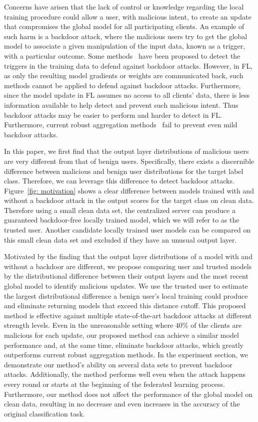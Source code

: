 \documentclass{article} %
\begin{document}
Concerns have arisen that the lack of control or knowledge regarding the local training procedure could allow a user, with malicious intent, to create an update that compromises the global model for all participating clients. An example of such harm is a backdoor attack,  where the malicious users try to get the global model to associate a given manipulation of the input data, known as a trigger, with a particular outcome. Some methods~\citep{kurita2020weight,qi2020onion,li2021backdoor} have been proposed to detect the triggers in the training data to defend against backdoor attacks. However, in FL, as only the resulting model gradients or weights are communicated back, such methods cannot be applied to defend against backdoor attacks. Furthermore, since the model update in FL assumes no access to all clients' data, there is less information available to help detect and prevent such malicious intent. Thus backdoor attacks may be easier to perform and harder to detect in FL.  Furthermore, current robust aggregation methods~\citep{trim-mean} fail to prevent even mild backdoor attacks.

In this paper, we first find that the output layer distributions of malicious users are very different from that of benign users. Specifically, there exists a discernible difference between malicious and benign user distributions for the target label class. Therefore, we can leverage this difference to detect backdoor attacks. Figure~\ref{fig: motivation} shows a clear difference between models trained with and without a backdoor attack in the output scores for the target class on clean data. Therefore using a small clean data set, the centralized server can produce a guaranteed backdoor-free locally trained model, which we will refer to as the trusted user. Another candidate locally trained user models can be compared on this small clean data set and excluded if they have an unusual output layer.

Motivated by the finding that the output layer distributions of a model with and without a backdoor are different, we propose comparing user and trusted models by the distributional difference between their output layers and the most recent global model to identify malicious updates. We use the trusted user to estimate the largest distributional difference a benign user's local training could produce and eliminate returning models that exceed this distance cutoff. This proposed method is effective against multiple state-of-the-art backdoor attacks at different strength levels. Even in the unreasonable setting where 40\% of the clients are malicious for each update, our proposed method can achieve a similar model performance and, at the same time, eliminate backdoor attacks, which greatly outperforms current robust aggregation methods. In the experiment section, we demonstrate our method's ability on several data sets to prevent backdoor attacks. Additionally, the method performs well even when the attack happens every round or starts at the beginning of the federated learning process. Furthermore, our method does not affect the performance of the global model on clean data, resulting in no decrease and even increases in the accuracy of the original classification task.
\end{document}
